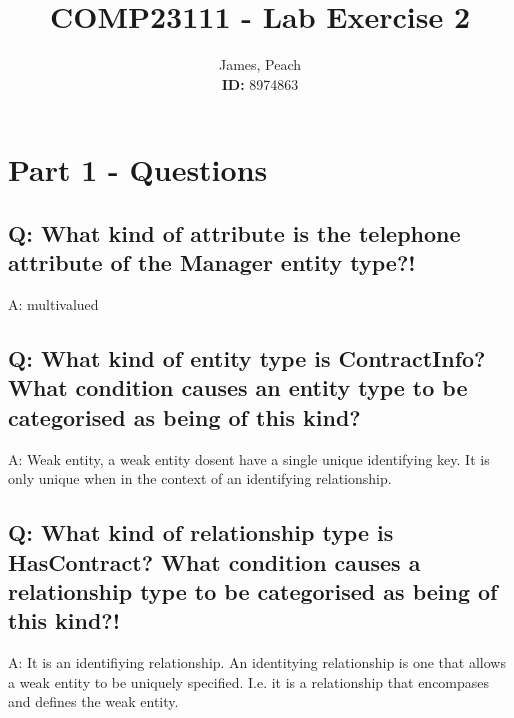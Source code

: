 \documentclass[11pt,a4paper]{article}
\begin{document}
\title{\textbf{COMP23111} - Lab Exercise 2}

\author{James, Peach \\ \textbf{ID:} 8974863} 


\maketitle
\thispagestyle{empty} %
\newpage %

\section{Part 1 - Questions}

\subsection{Q: What kind of attribute is the telephone attribute of the 
Manager entity type?!}

A: multivalued


\subsection{Q: What kind of entity type is ContractInfo? What condition causes an 
 entity type to be categorised as being of this kind?}

A: Weak entity, a weak entity dosent have a single unique identifying key.
 It is only unique when in the context of an identifying relationship.


\subsection{Q: What kind of relationship type is HasContract? What condition 
causes a relationship type to be categorised as being of this kind?!}

A: It is an identifiying relationship. An identitying relationship is one
that allows a weak entity to be uniquely specified. I.e. it is a relationship
that encompases and defines the weak entity.
\end{document}
